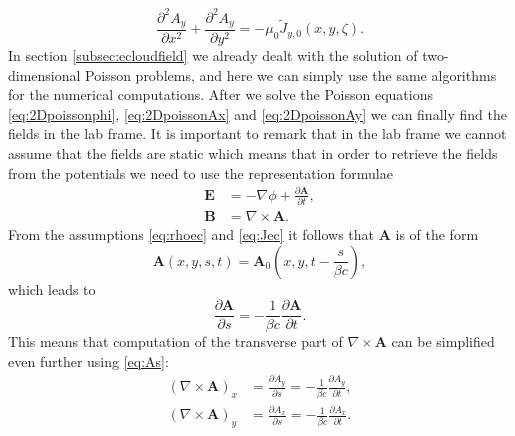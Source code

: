 \begin{equation}
    \frac{\partial^2 A_y}{\partial x^2} + \frac{\partial^2 A_y}{\partial y^2} = -\mu_0 \tilde{J}_{y,0}\left(x, y, \zeta\right).
    \label{eq:2DpoissonAy}
\end{equation}
In section \ref{subsec:ecloudfield} we already dealt with the solution of two-dimensional Poisson problems, and here we can simply use the same algorithms for the numerical computations.
After we solve the Poisson equations \ref{eq:2Dpoissonphi}, \ref{eq:2DpoissonAx} and \ref{eq:2DpoissonAy} we can finally find the fields in the lab frame. It is important to remark that in the lab frame we cannot assume that the fields are static which means that in order to retrieve the fields from the potentials we need to use the representation formulae
\begin{equation*}
    \begin{split}
        \mathbf{E} &= -\nabla \phi + \frac{\partial \mathbf A}{\partial t},\\
        \mathbf{B} &= \nabla \times \mathbf{A}.
    \end{split}
\end{equation*}
From the assumptions \ref{eq:rhoec} and \ref{eq:Jec} it follows that $\mathbf{A}$ is of the form
\begin{equation*}
    \mathbf{A}\left(x, y, s, t\right) = \mathbf{A}_0\left(x, y, t - \frac{s}{\beta c}\right),    
\end{equation*}
which leads to 
\begin{equation*}
    \frac{\partial \mathbf{A}}{\partial s} = -\frac{1}{\beta c}\frac{\partial \mathbf{A}}{\partial t}.    
\end{equation*}
This means that computation of the transverse part of $\nabla \times \mathbf{A}$ can be simplified even further using \ref{eq:As}:
\begin{equation*}
\begin{split}
    \left(\nabla \times \mathbf{A}\right)_x &= \frac{\partial A_y}{\partial s} = -\frac{1}{\beta c}\frac{\partial A_y}{\partial t},\\
    \left(\nabla \times \mathbf{A}\right)_y &= \frac{\partial A_x}{\partial s} = -\frac{1}{\beta c}\frac{\partial A_x}{\partial t}.
\end{split}
\end{equation*}

